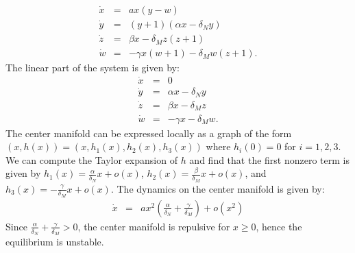 \documentclass[a4paper, 12pt]{article}
\begin{document}
\begin{eqnarray*}
\dot{x} &=&  ax (y - w) \\
\dot{y} &=& (y+1)(\alpha x - \delta_N y ) \\
\dot{z} &=& \beta x - \delta_M z (z+1)\\
\dot{w} &=& -\gamma x(w + 1) - \delta_M w (z+ 1).
\end{eqnarray*} 
The linear part of the system is given by:
\begin{eqnarray*}
\dot{x} &=& 0 \\
\dot{y} &=&\alpha x - \delta_N y \\
\dot{z} &=&\beta x - \delta_M z \\
\dot{w} &=&-\gamma x - \delta_M w.
\end{eqnarray*}
The center manifold can be expressed locally as a graph of the form $(x, h(x)) = (x, h_1(x), h_2(x), h_3(x))$ where $h_i(0) = 0$ for $i=1,2,3$.
We can compute the Taylor expansion of $h$ and find that the first nonzero term is given by $h_1(x) = \frac{\alpha}{\delta_N} x + o(x)$, $h_2(x) = \frac{\beta}{\delta_M} x + o(x)$, and $h_3(x) = -\frac{\gamma}{\delta_M} x + o(x)$.
The dynamics on the center manifold is given by: 
\begin{eqnarray*}
\dot{x} &=& ax^2\left(\frac{\alpha}{\delta_N}+ \frac{\gamma}{\delta_M}\right) + o(x^2)
\end{eqnarray*}
Since $\frac{\alpha}{\delta_N}+ \frac{\gamma}{\delta_M} > 0$, the center manifold is repulsive for $x \geq 0$, hence the equilibrium is unstable.
\end{document}
